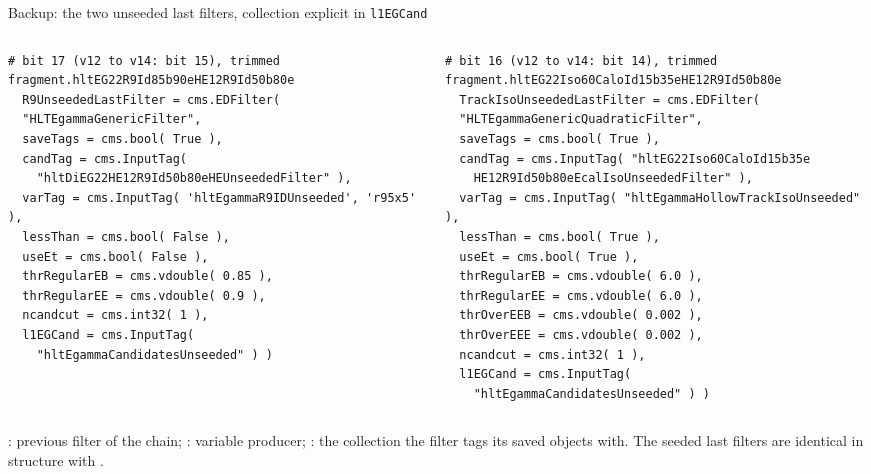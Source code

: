\begin{frame}[fragile]{Backup: the two unseeded last filters, collection explicit in \texttt{l1EGCand}}
  \begin{columns}[T]
    \begin{column}{0.49\linewidth}
\begin{lstlisting}
# bit 17 (v12 to v14: bit 15), trimmed
fragment.hltEG22R9Id85b90eHE12R9Id50b80e
  R9UnseededLastFilter = cms.EDFilter(
  "HLTEgammaGenericFilter",
  saveTags = cms.bool( True ),
  candTag = cms.InputTag(
    "hltDiEG22HE12R9Id50b80eHEUnseededFilter" ),
  varTag = cms.InputTag( 'hltEgammaR9IDUnseeded', 'r95x5' ),
  lessThan = cms.bool( False ),
  useEt = cms.bool( False ),
  thrRegularEB = cms.vdouble( 0.85 ),
  thrRegularEE = cms.vdouble( 0.9 ),
  ncandcut = cms.int32( 1 ),
  l1EGCand = cms.InputTag(
    "hltEgammaCandidatesUnseeded" ) )
\end{lstlisting}
    \end{column}
    \begin{column}{0.49\linewidth}
\begin{lstlisting}
# bit 16 (v12 to v14: bit 14), trimmed
fragment.hltEG22Iso60CaloId15b35eHE12R9Id50b80e
  TrackIsoUnseededLastFilter = cms.EDFilter(
  "HLTEgammaGenericQuadraticFilter",
  saveTags = cms.bool( True ),
  candTag = cms.InputTag( "hltEG22Iso60CaloId15b35e
    HE12R9Id50b80eEcalIsoUnseededFilter" ),
  varTag = cms.InputTag( "hltEgammaHollowTrackIsoUnseeded" ),
  lessThan = cms.bool( True ),
  useEt = cms.bool( True ),
  thrRegularEB = cms.vdouble( 6.0 ),
  thrRegularEE = cms.vdouble( 6.0 ),
  thrOverEEB = cms.vdouble( 0.002 ),
  thrOverEEE = cms.vdouble( 0.002 ),
  ncandcut = cms.int32( 1 ),
  l1EGCand = cms.InputTag(
    "hltEgammaCandidatesUnseeded" ) )
\end{lstlisting}
    \end{column}
  \end{columns}
  \par\vspace{4pt}
  {\scriptsize {}: previous filter of the chain; : variable producer; : the
  collection the filter tags its saved objects with. The seeded last filters are identical in structure with
  .}
\end{frame}


